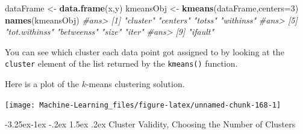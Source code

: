 \documentclass[]{book}
\makeatletter
\newenvironment{Shaded}{\begin{snugshade}}{\end{snugshade}}
\newcommand{\KeywordTok}[1]{\textcolor[rgb]{0.13,0.29,0.53}{\textbf{#1}}}
\newcommand{\DataTypeTok}[1]{\textcolor[rgb]{0.13,0.29,0.53}{#1}}
\newcommand{\DecValTok}[1]{\textcolor[rgb]{0.00,0.00,0.81}{#1}}
\newcommand{\StringTok}[1]{\textcolor[rgb]{0.31,0.60,0.02}{#1}}
\newcommand{\CommentTok}[1]{\textcolor[rgb]{0.56,0.35,0.01}{\textit{#1}}}
\newcommand{\OperatorTok}[1]{\textcolor[rgb]{0.81,0.36,0.00}{\textbf{#1}}}
\newcommand{\NormalTok}[1]{#1}
\let\origfigure\figure
\let\endorigfigure\endfigure
\renewenvironment{figure}[1][2] {
    \expandafter\origfigure\expandafter[H]
} {
    \endorigfigure
}
\renewcommand\subsection{\@startsection{subsection}{2}{\z@}%
                                     {-3.25ex\@plus -1ex \@minus -.2ex}%
                                     {1.5ex \@plus .2ex}%
                                     {\normalfont\large\bfseries\color{Violet}}}
\theoremstyle{definition}
\theoremstyle{definition}
\theoremstyle{definition}
\theoremstyle{remark}
\makeatother
\begin{document}
\begin{Shaded}
\begin{Highlighting}[]
\NormalTok{dataFrame <-}\StringTok{ }\KeywordTok{data.frame}\NormalTok{(x,y)}
\NormalTok{kmeansObj <-}\StringTok{ }\KeywordTok{kmeans}\NormalTok{(dataFrame,}\DataTypeTok{centers=}\DecValTok{3}\NormalTok{)}
\KeywordTok{names}\NormalTok{(kmeansObj)}
\CommentTok{#ans> [1] "cluster"      "centers"      "totss"        "withinss"    }
\CommentTok{#ans> [5] "tot.withinss" "betweenss"    "size"         "iter"        }
\CommentTok{#ans> [9] "ifault"}
\end{Highlighting}
\end{Shaded}

You can see which cluster each data point got assigned to by looking at
the \texttt{cluster} element of the list returned by the
\texttt{kmeans()} function.

\begin{Shaded}
\end{Shaded}

Here is a plot of the \(k\)-means clustering solution.

\begin{Shaded}
\end{Shaded}

\begin{figure}

{\centering \texttt{[image: Machine-Learning\_files/figure-latex/unnamed-chunk-168-1]} 

}

\caption{$k$-means clustering solution}\label{fig:unnamed-chunk-168}
\end{figure}

\subsection{Cluster Validity, Choosing the Number of
Clusters}\label{cluster-validity-choosing-the-number-of-clusters}
\end{document}
